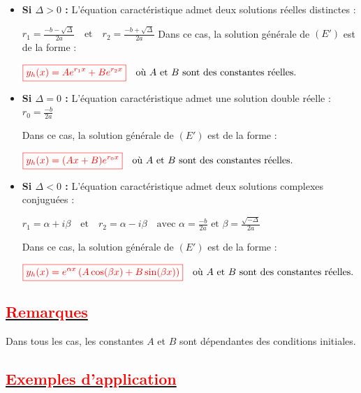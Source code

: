 \documentclass[12pt,a4paper]{article}
\begin{document}
\begin{itemize}
    \item[$\bullet$] \textbf{Si $\Delta > 0$ :} L'équation caractéristique admet deux solutions réelles distinctes :
    
    $ r_1 = \frac{-b-\sqrt{\Delta}}{2a} \quad \text{et} \quad r_2 = \frac{-b+\sqrt{\Delta}}{2a} $
    Dans ce cas, la solution générale de $(E')$ est de la forme :
    
    $ \textcolor{red}{\boxed{ y_h(x) = A e^{r_1 x} + B e^{r_2 x} }} \quad \text{où } A \text{ et } B \text{ sont des constantes réelles.} $

    \item[$\bullet$] \textbf{Si $\Delta = 0$ :} L'équation caractéristique admet une solution double réelle :
    $ r_0 = \frac{-b}{2a} $
    
    Dans ce cas, la solution générale de $(E')$ est de la forme :
    
    $ \textcolor{red}{\boxed{ y_h(x) = (Ax + B)e^{r_0 x} }} \quad \text{où } A \text{ et } B \text{ sont des constantes réelles.} $

    \item[$\bullet$] \textbf{Si $\Delta < 0$ :} L'équation caractéristique admet deux solutions complexes conjuguées :
    
    $ r_1 = \alpha + i\beta \quad \text{et} \quad r_2 = \alpha - i\beta \quad \text{avec } \alpha = \frac{-b}{2a} \text{ et } \beta = \frac{\sqrt{-\Delta}}{2a} $
    
    Dans ce cas, la solution générale de $(E')$ est de la forme :
    
    $ \textcolor{red}{\boxed{ y_h(x) = e^{\alpha x} \left( A\cos(\beta x) + B\sin(\beta x) \right) }} \quad \text{où } A \text{ et } B \text{ sont des constantes réelles.} $
\end{itemize}


\subsection*{\underline{\textbf{\textcolor{red}{Remarques}}}}
Dans tous les cas, les constantes $A$ et $B$ sont dépendantes des conditions initiales.

\subsection*{\underline{\textbf{\textcolor{red}{Exemples d'application}}}}
\end{document}
